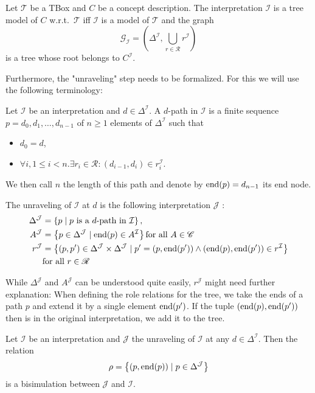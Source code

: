 \begin{definition}\label{def:tree model}
	Let $\mathcal{T}$ be a TBox and $C$ be a concept description.
	The interpretation $\mathcal{I}$ is a tree model of $C$ w.r.t.\ $\mathcal{T}$ iff
	$\mathcal{I}$ is a model of $\mathcal{T}$ and the graph 
			\[
				\mathcal{G}_{\mathcal{I}} = \left( \Delta^{\mathcal{I}}, \bigcup_{r \in \mathscr{R}} r^{\mathcal{I}} \right)
			\]
			is a tree whose root belongs to $C^{\mathcal{I}}$.
\end{definition}

Furthermore, the "unraveling" step needs to be formalized.
For this we will use the following terminology:

Let $\mathcal{I}$ be an interpretation and $d \in \Delta^{\mathcal{I}}$.
A $d$-path in $\mathcal{I}$ is a finite sequence $p = d_0,d_1,\ldots,d_{n-1}$ of $n \geq 1$ elements of $\Delta^{\mathcal{I}}$ such that
\begin{itemize}
	\item $d_0 = d$,
	\item $\forall i, 1 \leq i < n .\exists r_i \in \mathscr{R}: (d_{i-1},d_i) \in r_{i}^{\mathcal{I}}$.
\end{itemize}
We then call $n$ the length of this path and denote by $\operatorname{\text{end}}(p) = d_{n-1}$ its end node.

\begin{definition}[Unraveling]\label{def:unraveling}
	The unraveling of $\mathcal{I}$ at $d$ is the following interpretation $\mathcal{J}$ :
	\begin{align*}
		\Delta^{\mathcal{J}} &= \left\{ p \mid p \text{ is a $d$-path in $\mathcal{I}$} \right\}, \\
		A^{\mathcal{J}} &= \left\{ p \in \Delta^{\mathcal{J}} \mid \operatorname{\text{end}}(p) \in A^{\mathcal{I}} \right\} \text{for all } A \in \mathscr{C} \\
		r^{\mathcal{J}} &= \left\{ (p,p') \in \Delta^{\mathcal{J}} \times \Delta^{\mathcal{J}} \mid p'=(p, \operatorname{\text{end}}(p')) \land (\operatorname{\text{end}}(p),\operatorname{\text{end}}(p')) \in r^{\mathcal{I}} \right\} \\
						&\text{for all } r \in \mathscr{R}
	\end{align*}
\end{definition}
\begin{note}
	While $\Delta^{\mathcal{J}}$ and $A^{\mathcal{J}}$ can be understood quite easily, $r^{\mathcal{J}}$ might need further explanation:
	When defining the role relations for the tree, we take the ends of a path $p$
	and extend it by a single element $\operatorname{\text{end}}(p')$. If the tuple $(\operatorname{\text{end}}(p), \operatorname{\text{end}}(p'))$ then is in the original interpretation,
	we add it to the tree.
\end{note}

\begin{lemma}\label{lem:tree model bisimulation}
	Let $\mathcal{I}$ be an interpretation and $\mathcal{J}$ the unraveling of $\mathcal{I}$ at any $d \in \Delta^{\mathcal{I}}$.
	Then the relation
	\[
		\rho = \left\{ (p,\operatorname{\text{end}}(p)) \mid p \in \Delta^{\mathcal{J}} \right\}
	\]
	is a bisimulation between $\mathcal{J}$ and $\mathcal{I}$.
\end{lemma}
